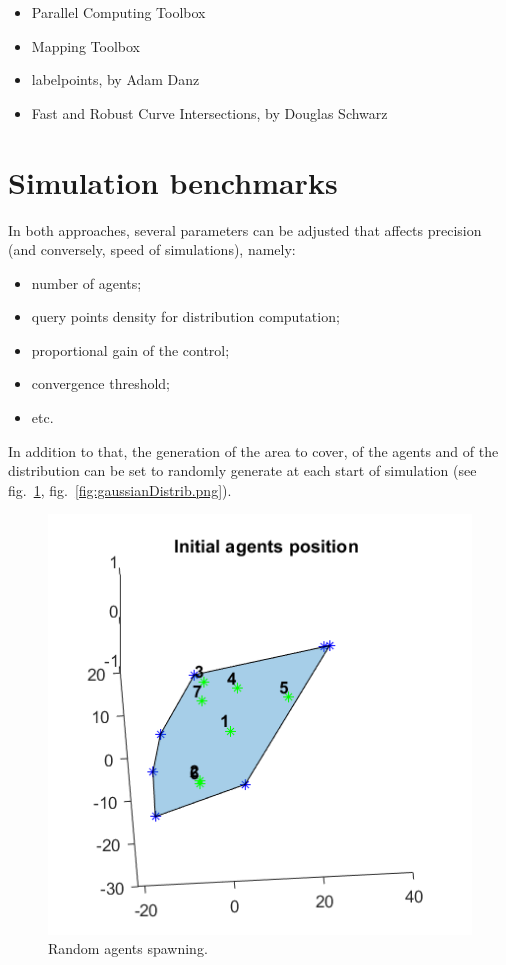 \documentclass[a4paper,11pt,oneside]{book}
\begin{document}
	\begin{itemize}
		\item Parallel Computing Toolbox
		\item Mapping Toolbox
		\item labelpoints, by Adam Danz
		\item Fast and Robust Curve Intersections, by Douglas Schwarz
	\end{itemize}
	
	\section{Simulation benchmarks}
	
	In both approaches, several parameters can be adjusted that affects precision (and conversely, speed of simulations), namely:
	
	\begin{itemize}
		\item number of agents;
		\item query points density for distribution computation;
		\item proportional gain of the control;
		\item convergence threshold;
		\item etc.
	\end{itemize}
	
	In addition to that, the generation of the area to cover, of the agents and of the distribution can be set to randomly generate at each start of simulation (see fig.~\ref{fig:randomAgents.png}, fig.~\ref{fig:gaussianDistrib.png}).
	
	\begin{figure}	
		\centering	
		\includegraphics[scale=0.7]{figs/randomAgents.png}
		\caption{Random agents spawning.}\label{fig:randomAgents.png}	
	\end{figure}
	
\end{document}
